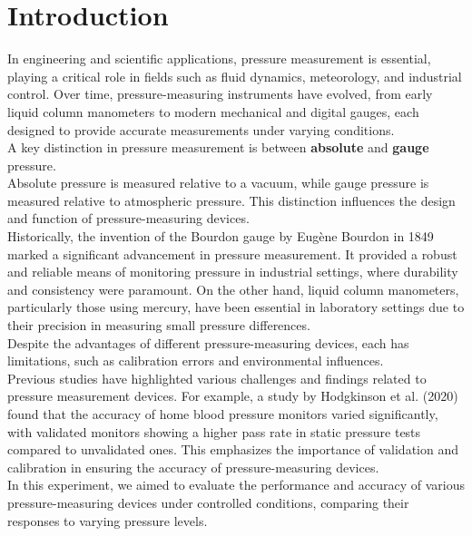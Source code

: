 \documentclass{article}
\begin{document}
	
	\newpage\vspace*{-20pt}

	\section{Introduction}
	In engineering and scientific applications, pressure measurement is essential, playing a critical role in fields such as fluid dynamics, meteorology, and industrial control. Over time, pressure-measuring instruments have evolved, from early liquid column manometers to modern mechanical and digital gauges, each designed to provide accurate measurements under varying conditions.\\[1em]
	A key distinction in pressure measurement is between \textbf{absolute} and \textbf{gauge} pressure.\\ 
	Absolute pressure is measured relative to a vacuum, while gauge pressure is measured relative to atmospheric pressure. This distinction influences the design and function of pressure-measuring devices.\\[1em]
	Historically, the invention of the Bourdon gauge by Eugène Bourdon in 1849 marked a significant advancement in pressure measurement. It provided a robust and reliable means of monitoring pressure in industrial settings, where durability and consistency were paramount. On the other hand, liquid column manometers, particularly those using mercury, have been essential in laboratory settings due to their precision in measuring small pressure differences.\\[1em]
	Despite the advantages of different pressure-measuring devices, each has limitations, such as calibration errors and environmental influences.\\[1em]
	Previous studies have highlighted various challenges and findings related to pressure measurement devices. For example, a study by Hodgkinson et al. (2020) found that the accuracy of home blood pressure monitors varied significantly, with validated monitors showing a higher pass rate in static pressure tests compared to unvalidated ones. This emphasizes the importance of validation and calibration in ensuring the accuracy of pressure-measuring devices.\\[1em]
	In this experiment, we aimed to evaluate the performance and accuracy of various pressure-measuring devices under controlled conditions, comparing their responses to varying pressure levels.
	
	\newpage\restoregeometry
\end{document}
